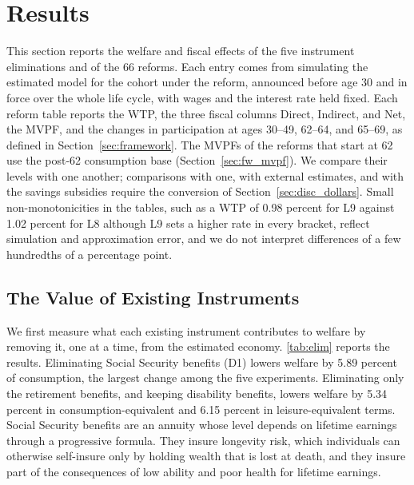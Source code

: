 \section{Results}\label{sec:results}

This section reports the welfare and fiscal effects of the five instrument eliminations and of the 66 reforms. Each entry comes from simulating the estimated model for the cohort under the reform, announced before age 30 and in force over the whole life cycle, with wages and the interest rate held fixed. Each reform table reports the WTP, the three fiscal columns Direct, Indirect, and Net, the MVPF, and the changes in participation at ages 30--49, 62--64, and 65--69, as defined in Section~\ref{sec:framework}. The MVPFs of the reforms that start at 62 use the post-62 consumption base (Section~\ref{sec:fw_mvpf}). We compare their levels with one another; comparisons with one, with external estimates, and with the savings subsidies require the conversion of Section~\ref{sec:disc_dollars}. Small non-monotonicities in the tables, such as a WTP of 0.98 percent for L9 against 1.02 percent for L8 although L9 sets a higher rate in every bracket, reflect simulation and approximation error, and we do not interpret differences of a few hundredths of a percentage point.

\subsection{The Value of Existing Instruments}\label{sec:results_elim}

We first measure what each existing instrument contributes to welfare by removing it, one at a time, from the estimated economy. \autoref{tab:elim} reports the results. Eliminating Social Security benefits (D1) lowers welfare by 5.89 percent of consumption, the largest change among the five experiments. Eliminating only the retirement benefits, and keeping disability benefits, lowers welfare by 5.34 percent in consumption-equivalent and 6.15 percent in leisure-equivalent terms. %
Social Security benefits are an annuity whose level depends on lifetime earnings through a progressive formula. They insure longevity risk, which individuals can otherwise self-insure only by holding wealth that is lost at death, and they insure part of the consequences of low ability and poor health for lifetime earnings.

